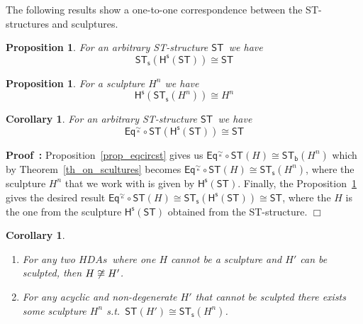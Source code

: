 \documentclass[submission,copyright,creativecommons]{eptcs}
\newtheorem{proposition}[theorem]{Proposition}
\newtheorem{corollary}[theorem]{Corollary}
\newenvironment{proof}[1][\!\!\,]{\vspace{1ex}\noindent\textbf{Proof #1: }}{\hfill$\Box$\vspace{2ex}}
\newcommand\HDAs{\ensuremath{\mathit{HDAs}}}
\newcommand\ST{\ensuremath{\mathsf{ST}}}
\newcommand\isomorphic{\ensuremath{\cong}}
\newcommand\stintoh{\ensuremath{\mathsf{H}}}
\newcommand\stintosculpture{\ensuremath{\stintoh^{\mathsf{s}}}}
\newcommand\hintost{\ensuremath{\mathsf{ST}}}
\newcommand\equiatingEvents[1]{\ensuremath{\mathsf{Eq}^{#1}}}
\newcommand\sculpintost{\ensuremath{\mathsf{ST}_{\!\mathsf{s}}}}
\newcommand\hintostScultures{\ensuremath{\mathsf{ST}_{\!\mathsf{b}}}}
\newcommand\sculpture[2]{\ensuremath{#1^{#2}}}
\newcommand\eventEquivFromBulk[1]{\ensuremath{\underset{\mathsf{#1}}{\sim}}}
\begin{document}
The following results show a one-to-one correspondence between the ST-structures and sculptures.

\begin{proposition}\label{prop_stSculptst}
For an arbitrary ST-structure \ST\ we have
\[
\sculpintost(\stintosculpture(\ST))\isomorphic \ST
\]
\end{proposition}



\begin{proposition}
For a sculpture \sculpture{H}{n} we have
\[
\stintosculpture(\sculpintost(\sculpture{H}{n}))\isomorphic \sculpture{H}{n}
\]
\end{proposition}

\begin{corollary}
For an arbitrary ST-structure \ST\ we have
\[
\equiatingEvents{\eventEquivFromBulk{n}}\circ\hintost(\stintosculpture(\ST))\isomorphic \ST
\]
\end{corollary}

\begin{proof}
Proposition~\ref{prop_eqcircst} gives us $\equiatingEvents{\eventEquivFromBulk{n}}\circ\hintost(H)\isomorphic \hintostScultures(\sculpture{H}{n})$ which by Theorem~\ref{th_on_scultures} becomes $\equiatingEvents{\eventEquivFromBulk{n}}\circ\hintost(H)\isomorphic \sculpintost(\sculpture{H}{n})$, where the sculpture $\sculpture{H}{n}$ that we work with is given by $\stintosculpture(\ST)$. Finally, the Proposition~\ref{prop_stSculptst} gives the desired result $\equiatingEvents{\eventEquivFromBulk{n}}\circ\hintost(H)\isomorphic \sculpintost(\stintosculpture(\ST))\isomorphic \ST$, where the $H$ is the one from the sculpture $\stintosculpture(\ST)$ obtained from the ST-structure.
\end{proof}



\begin{corollary}
\ 

\begin{enumerate}
\item For any two \HDAs\ where one $H$ cannot be a sculpture and $H'$ can be sculpted, then $H\not\isomorphic H'$.

\item For any acyclic and non-degenerate $H'$ that cannot be sculpted there exists some sculpture $\sculpture{H}{n}$ s.t.\ $\hintost(H')\isomorphic\sculpintost(\sculpture{H}{n})$.
\end{enumerate}
\end{corollary}
\end{document}
